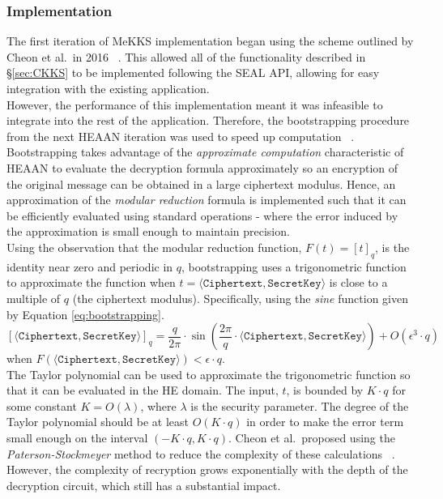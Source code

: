 \subsubsection{Implementation}
\setlength{\leftskip}{0.5cm}
\indent \indent
The first iteration of MeKKS implementation began using the scheme outlined by Cheon et al.\ in 2016 ~\cite{CKKS}. This allowed all of the functionality described in §\ref{sec:CKKS} to be implemented following the SEAL API, allowing for easy integration with the existing application.
\smallskip \\ \indent
However, the performance of this implementation meant it was infeasible to integrate into the rest of the application. Therefore, the bootstrapping procedure from the next HEAAN iteration was used to speed up computation ~\cite{BootstrappingHEAAN}. Bootstrapping takes advantage of the \textit{approximate computation} characteristic of HEAAN to evaluate the decryption formula approximately so an encryption of the original message can be obtained in a large ciphertext modulus. Hence, an approximation of the \textit{modular reduction} formula is implemented such that it can be efficiently evaluated using standard operations - where the error induced by the approximation is small enough to maintain precision.
\smallskip \\ \indent
Using the observation that the modular reduction function, $F(t) = [t]_q$, is the identity near zero and periodic in $q$, bootstrapping uses a trigonometric function to approximate the function when $t = \langle \texttt{Ciphertext}, \texttt{SecretKey} \rangle$ is close to a multiple of $q$ (the ciphertext modulus). Specifically, using the \textit{sine} function given by Equation \ref{eq:bootstrapping}.
\begin{equation}
    \label{eq:bootstrapping}
    [\langle \texttt{Ciphertext}, \texttt{SecretKey} \rangle]_q = \frac{q}{2 \pi} \cdot \sin \left( \frac{2 \pi}{q} \cdot \langle \texttt{Ciphertext}, \texttt{SecretKey} \rangle \right) + O(\epsilon^3 \cdot q)
\end{equation}
when $F(\langle \texttt{Ciphertext}, \texttt{SecretKey} \rangle) < \epsilon \cdot q$.
\smallskip \\ \indent
The Taylor polynomial can be used to approximate the trigonometric function so that it can be evaluated in the HE domain. The input, $t$, is bounded by $K \cdot q$ for some constant $K = O(\lambda)$, where $\lambda$ is the security parameter. The degree of the Taylor polynomial should be at least $O(K \cdot q)$ in order to make the error term small enough on the interval $(-K \cdot q, K \cdot q)$. Cheon et al.\ proposed using the \textit{Paterson-Stockmeyer} method to reduce the complexity of these calculations ~\cite{BootstrappingHEAAN, Paterson}. However, the complexity of recryption grows exponentially with the depth of the decryption circuit, which still has a substantial impact.
